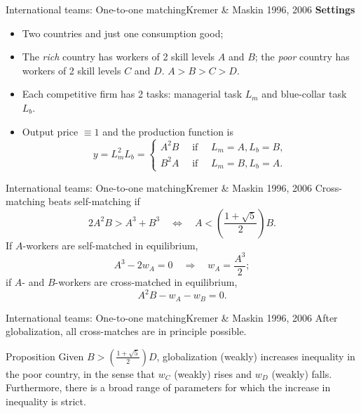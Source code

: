 \documentclass{beamer}
\begin{document}
\begin{frame}{International teams: One-to-one matching}{Kremer \& Maskin 1996, 2006}
	\textbf{Settings}
	\begin{itemize}
		\item Two countries and just one consumption good;
		\item The \textit{rich} country has workers of 2 skill levels $A$ and $B$; the \textit{poor} country has workers of 2 skill levels $C$ and $D$. $A>B>C>D$.
		\item Each competitive firm has 2 tasks: managerial task $L_m$ and blue-collar task $L_b$.
		\item Output price $\equiv 1$ and the production function is
		\begin{equation}
			y=L_m^2L_b=\begin{cases}
				A^2B \quad \mbox{ if }\quad L_m=A, L_b=B, \\
				B^2A \quad \mbox{ if }\quad L_m=B, L_b=A.
			\end{cases}
		\end{equation}
	\end{itemize}
\end{frame}
\begin{frame}{International teams: One-to-one matching}{Kremer \& Maskin 1996, 2006}
	Cross-matching beats self-matching if
	\begin{equation}
		2A^2B > A^3 + B^3 \quad \Leftrightarrow \quad A<\left(\frac{1+\sqrt{5}}{2}\right)B.
	\end{equation}
	If $A$-workers are self-matched in equilibrium,
	\begin{equation}
		A^3-2w_A=0\quad\Rightarrow\quad w_A=\frac{A^3}{2};
	\end{equation}
	if $A$- and $B$-workers are cross-matched in equilibrium,
	\begin{equation}
		A^2B-w_A-w_B=0.
	\end{equation}
\end{frame}
\begin{frame}{International teams: One-to-one matching}{Kremer \& Maskin 1996, 2006}
	After globalization, all cross-matches are in principle possible.
	\medskip
	\begin{block}{Proposition}
		Given $B>\left(\frac{1+\sqrt{5}}{2}\right)D$, globalization (weakly) increases inequality in the poor country, in the sense that $w_C$ (weakly) rises and $w_D$ (weakly) falls. Furthermore, there is a broad range of parameters for which the increase in inequality is strict.
	\end{block}
\end{frame}
\end{document}
